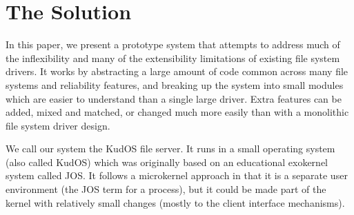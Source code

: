 \section{The Solution}
\label{sec:solution}

In this paper, we present a prototype system that attempts to address much of
the inflexibility and many of the extensibility limitations of existing file
system drivers. It works by abstracting a large amount of code common across
many file systems and reliability features, and breaking up the system into
small modules which are easier to understand than a single large driver. Extra
features can be added, mixed and matched, or changed much more easily than with
a monolithic file system driver design.

We call our system the KudOS file server. It runs in a small operating system
(also called KudOS) which was originally based on an educational exokernel
system called JOS. It follows a microkernel approach in that it is a separate
user environment (the JOS term for a process), but it could be made part of the
kernel with relatively small changes (mostly to the client interface
mechanisms).



